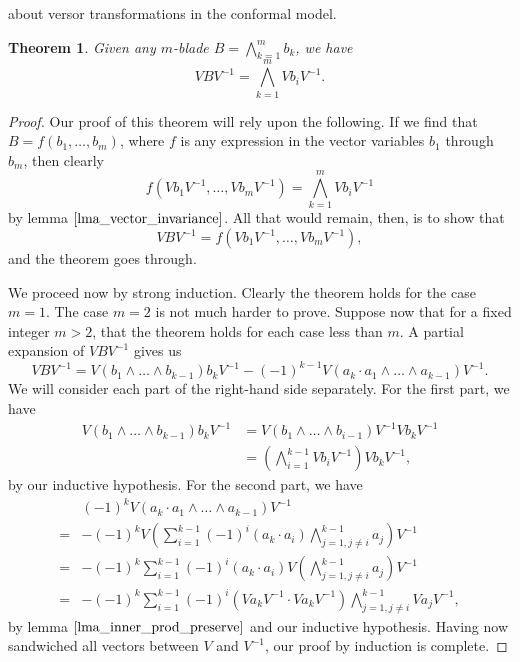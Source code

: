 \documentclass[12pt]{article}
\newtheorem{theorem}{Theorem}[section]
\begin{document}
about versor transformations in the conformal model.
\begin{theorem}\label{thm_outer_prod_preserve}
Given any $m$-blade $B=\bigwedge_{k=1}^m b_k$, we have
\begin{equation*}
VBV^{-1} = \bigwedge_{k=1}^m Vb_iV^{-1}.
\end{equation*}
\end{theorem}
\begin{proof}
Our proof of this theorem will rely upon the following.  If we find that $B=f(b_1,\dots,b_m)$,
where $f$ is any expression in the vector variables $b_1$ through $b_m$, then
clearly
\begin{equation*}
f(Vb_1V^{-1},\dots,Vb_mV^{-1})=\bigwedge_{k=1}^m Vb_iV^{-1}
\end{equation*}
by lemma $\eqref{lma_vector_invariance}$.
All that would remain, then, is to show that
\begin{equation*}
VBV^{-1}=f(Vb_1V^{-1},\dots,Vb_mV^{-1}),
\end{equation*}
and the theorem goes through.

We proceed now by strong induction.  Clearly the theorem holds for the case $m=1$.
The case $m=2$ is not much harder to prove.
Suppose now that for a fixed integer $m>2$, that the theorem holds for each case less
than $m$.  A partial expansion of $VBV^{-1}$ gives us
\begin{equation*}
VBV^{-1} = V(b_1\wedge\dots\wedge b_{k-1})b_kV^{-1} - (-1)^{k-1}V(a_k\cdot a_1\wedge\dots\wedge a_{k-1})V^{-1}.
\end{equation*}
We will consider each part of the right-hand side separately.  For the first part, we have
\begin{align*}
V(b_1\wedge\dots\wedge b_{k-1})b_kV^{-1} &=
V(b_1\wedge\dots\wedge b_{i-1})V^{-1}Vb_kV^{-1} \\
&= \left(\bigwedge_{i=1}^{k-1}Vb_iV^{-1}\right)Vb_kV^{-1},
\end{align*}
by our inductive hypothesis.  For the second part, we have
\begin{align*}
 & (-1)^k V(a_k\cdot a_1\wedge\dots\wedge a_{k-1})V^{-1} \\
 =& -(-1)^k V\left(\sum_{i=1}^{k-1}(-1)^i (a_k\cdot a_i)\bigwedge_{j=1,j\neq i}^{k-1} a_j\right)V^{-1} \\
 =& -(-1)^k\sum_{i=1}^{k-1}(-1)^i (a_k\cdot a_i)V\left(\bigwedge_{j=1,j\neq i}^{k-1} a_j \right)V^{-1} \\
 =& -(-1)^k\sum_{i=1}^{k-1}(-1)^i(Va_kV^{-1}\cdot Va_kV^{-1})\bigwedge_{j=1,j\neq i}^{k-1} Va_jV^{-1},
\end{align*}
by lemma $\eqref{lma_inner_prod_preserve}$ and our inductive hypothesis.
Having now sandwiched all vectors between $V$ and $V^{-1}$, our proof by
induction is complete.
\end{proof}
\end{document}

